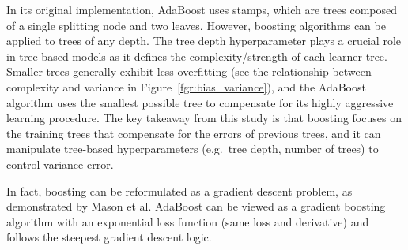 \documentclass[main]{subfiles}
\begin{document}
In its original implementation, AdaBoost uses stamps, which are trees composed of a single splitting node and two leaves. However, boosting algorithms can be applied to trees of any depth. The tree depth hyperparameter plays a crucial role in tree-based models as it defines the complexity/strength of each learner tree. Smaller trees generally exhibit less overfitting (see the relationship between complexity and variance in Figure~\ref{fgr:bias_variance}), and the AdaBoost algorithm uses the smallest possible tree to compensate for its highly aggressive learning procedure. The key takeaway from this study is that boosting focuses on the training trees that compensate for the errors of previous trees, and it can manipulate tree-based hyperparameters (e.g.\ tree depth, number of trees) to control variance error.

In fact, boosting can be reformulated as a gradient descent problem, as demonstrated by Mason et al.\autocite{mason1999boosting} AdaBoost can be viewed as a gradient boosting algorithm with an exponential loss function (same loss and derivative) and follows the steepest gradient descent logic.\autocite{mason1999boosting,azencott2022introduction} 
\end{document}
